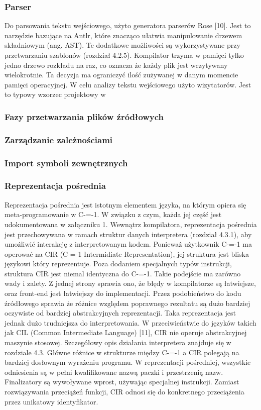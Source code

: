 \subsubsection{Parser}
Do parsowania tekstu wejściowego, użyto generatora parserów Rose [10]. Jest to narzędzie bazujące na Antlr, które znacząco ułatwia manipulowanie drzewem składniowym (ang. AST). Te dodatkowe możliwości są wykorzystywane przy przetwarzaniu szablonów (rozdział 4.2.5).
Kompilator trzyma w pamięci tylko jedno drzewo rozkładu na raz, co oznacza że każdy plik jest wczytywany wielokrotnie. Ta decyzja ma ograniczyć ilość zużywanej w danym momencie pamięci operacyjnej.
W celu analizy tekstu wejściowego użyto wizytatorów. Jest to typowy wzorzec projektowy w 
\subsubsection{Fazy przetwarzania plików źródłowych}

\subsubsection{Zarządzanie zależnościami}

\subsubsection{Import symboli zewnętrznych}

\subsubsection{Reprezentacja pośrednia}
Reprezentacja pośrednia jest istotnym elementem języka, na którym opiera się meta-programowanie w C-=-1. W związku z czym, każda jej część jest udokumentowana w załączniku 1. Wewnątrz kompilatora, reprezentacja pośrednia jest przechowywana w ramach struktur danych interpretera (rozdział 4.3.1), aby umożliwić interakcję z interpretowanym kodem.
Ponieważ użytkownik C-=-1 ma operować na CIR (C-=-1 Intermidiate Representation), jej struktura jest bliska językowi który reprezentuje. Poza dodaniem specjalnych typów instrukcji, struktura CIR jest niemal identyczna do C-=-1. Takie podejście ma zarówno wady i zalety. 
Z jednej strony sprawia ono, że błędy w kompilatorze są łatwiejsze, oraz front-end jest łatwiejszy do implementacji. Przez podobieństwo do kodu źródłowego sprawia że różnice względem poprawnego rezultatu są dużo bardziej oczywiste od bardziej abstrakcyjnych reprezentacji.
Taka reprezentacja jest jednak dużo trudniejsza do interpretowania. W przeciwieństwie do języków takich jak CIL (Common Intermediate Language) [11], CIR nie operuje abstrakcyjnej maszynie stosowej. Szczegółowy opis działania interpretera znajduje się w rozdziale 4.3.
Główne różnice w strukturze między C-=-1 a CIR polegają na bardziej dosłownym wyrażeniu programu. W reprezentacji pośredniej, wszystkie odniesienia są w pełni kwalifikowane nazwą paczki i przestrzenią nazw. Finalizatory są wywoływane wprost, używając specjalnej instrukcji. Zamiast rozwiązywania przeciążeń funkcji, CIR odnosi się do konkretnego przeciążenia przez unikatowy identyfikator.
